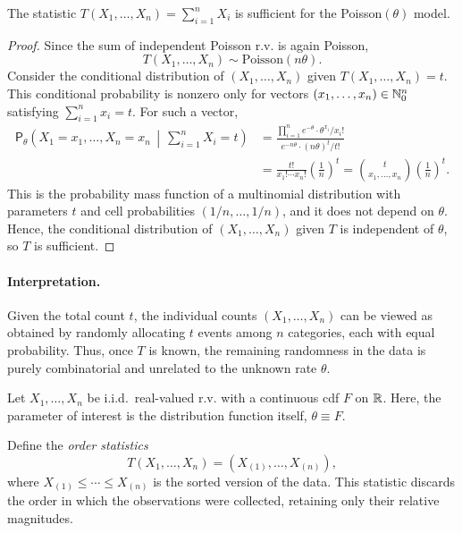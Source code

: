 \begin{claim}
The statistic $T(X_1,\dots,X_n)=\sum_{i=1}^n X_i$ is sufficient for the Poisson$(\theta)$ model.
\end{claim}

\begin{proof}
Since the sum of independent Poisson r.v. is again Poisson,
\[
T(X_1,\dots,X_n) \sim \text{Poisson}(n\theta).
\]
Consider the conditional distribution of $(X_1,\dots,X_n)$ given $T(X_1,\dots,X_n)=t$.
This conditional probability is nonzero only for vectors $(x_1,\dots,x_n)\in\mathbb{N}_0^n$
satisfying $\sum\limits_{i=1}^n x_i = t$.
For such a vector,
\begin{align*}
\mathsf{P}_{\theta}\!\left(
X_1=x_1,\dots,X_n=x_n \,\middle|\, \sum_{i=1}^n X_i=t
\right)
&=
\frac{\prod\limits_{i=1}^n e^{-\theta}\cdot \theta^{x_i}/x_i!}
     {e^{-n\theta}\cdot (n\theta)^t/t!} \\
&=
\frac{t!}{x_1!\cdots x_n!}\left(\frac{1}{n}\right)^t
= \binom{t}{x_1,\dots,x_n}\left(\frac{1}{n}\right)^t.
\end{align*}
This is the probability mass function of a multinomial distribution with
parameters $t$ and cell probabilities $(1/n,\dots,1/n)$, and it does not depend on $\theta$.
Hence, the conditional distribution of $(X_1,\dots,X_n)$ given $T$ is independent of $\theta$,
so $T$ is sufficient.
\end{proof}

\paragraph{Interpretation.}
Given the total count $t$, the individual counts $(X_1,\dots,X_n)$ can be viewed as obtained
by randomly allocating $t$ events among $n$ categories, each with equal probability.
Thus, once $T$ is known, the remaining randomness in the data is purely combinatorial
and unrelated to the unknown rate $\theta$.

\bigskip

\begin{ex}
    \label{ex:ch3_cos}
Let $X_1,\dots,X_n$ be i.i.d.\ real-valued r.v. with a continuous cdf $F$ on $\mathbb{R}$.
Here, the parameter of interest is the distribution function itself, $\theta \equiv F$.

Define the \emph{order statistics}
\[
T(X_1,\dots,X_n) = (X_{(1)},\dots,X_{(n)}),
\]
where $X_{(1)} \le \cdots \le X_{(n)}$ is the sorted version of the data.
This statistic discards the order in which the observations were collected,
retaining only their relative magnitudes.
\end{ex}

